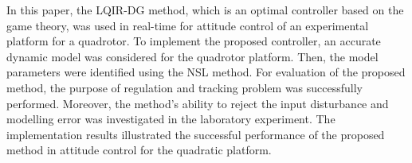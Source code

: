 \documentclass[3p,times]{elsarticle}
\begin{document}
\noindent In this paper, the LQIR-DG method, which is an optimal controller based on the game theory, was used in real-time for attitude control of an experimental platform for a quadrotor.
To implement the proposed controller, an accurate dynamic model was considered for the quadrotor platform.
Then, the model parameters were identified using the NSL method.
For evaluation of the proposed method, the purpose of regulation and tracking problem was successfully performed.
Moreover, the method's ability to reject the input disturbance and modelling error was investigated in the laboratory experiment.
The implementation results illustrated the successful performance of the proposed method in attitude control for the quadratic platform.

















\end{document}
